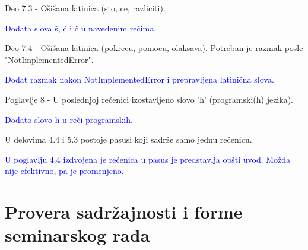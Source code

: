 \documentclass[a4paper]{report}
\newcommand{\odgovor}[1]{\textcolor{blue}{#1}}
\begin{document}
Deo 7.3 - O\v si\v sana latinica (sto, ce, razliciti).

\odgovor{
Dodata slova š, ć i č u navedenim rečima.
}

Deo 7.4 - O\v si\v sana latinica (pokrecu, pomocu, olaksava). Potreban je razmak posle "NotImplementedError".

\odgovor{
Dodat razmak nakon NotImplementedError i prepravljena latinična slova.
}

Poglavlje 8 - U poslednjoj re\v cenici izostavljeno slovo 'h' (programski(h) jezika).

\odgovor{
Dodato slovo h u reči programskih.
}

U delovima 4.4 i 5.3 postoje pasusi koji sadr\v ze samo jednu re\v cenicu.

\odgovor{
U poglavlju 4.4 izdvojena je rečenica u pasus je predstavlja opšti uvod. Možda nije efektivno, pa je promenjeno. 
}

\section{Provera sadržajnosti i forme seminarskog rada}
\end{document}

